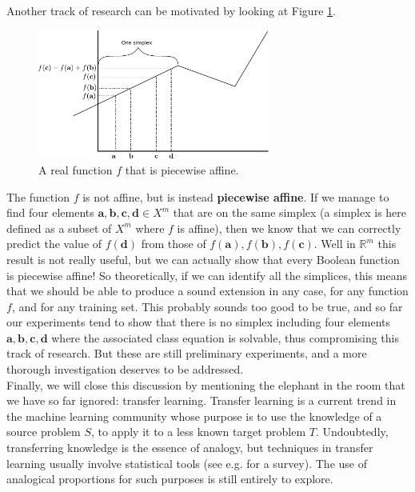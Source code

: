 Another track of research can be motivated by looking at Figure
\ref{FIG:piecewise_affine}.
\begin{figure}[!h]
\centering
  \includegraphics[width=3in]{figures/piecewise_affine.pdf}
  \caption{A real function $f$ that is piecewise affine.}
\label{FIG:piecewise_affine}
\end{figure}
The function $f$ is not affine, but is instead
\textbf{piecewise affine}. If we manage to find four elements $\mathbf{a},
\mathbf{b}, \mathbf{c}, \mathbf{d} \in X^m$ that are on the same simplex (a
simplex is here defined as a subset of $X^m$ where $f$ is affine), then we know
that we can correctly predict the value of $f(\mathbf{d})$ from those of
$f(\mathbf{a}), f(\mathbf{b}), f(\mathbf{c})$. Well in $\mathbb{R}^m$ this
result is not really useful, but we can actually show that every Boolean
function is piecewise affine! So theoretically, if we can identify all the
simplices, this means that we should be able to produce a sound extension in any
case, for any function $f$, and for any training set. This probably sounds too
good to be true, and so far our experiments tend to show that there is no
simplex including four elements $\mathbf{a}, \mathbf{b}, \mathbf{c},
\mathbf{d}$ where the associated class equation is solvable, thus compromising
this track of research. But these are still preliminary experiments, and a more
thorough investigation deserves to be addressed.\\

Finally, we will close this discussion by mentioning the elephant in the room
that we have so far ignored: transfer learning. Transfer learning is a current
trend in the machine learning community whose purpose is to use the knowledge
of a source problem $S$, to apply it to a less known target problem $T$.
Undoubtedly, transferring knowledge is the essence of analogy, but techniques in
transfer learning usually involve statistical tools (see e.g.
\cite{PanYanTKDE10} for a survey). The use of analogical proportions for such
purposes is still entirely to explore.
